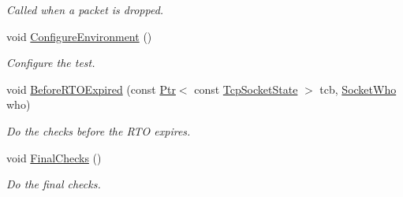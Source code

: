 \begin{DoxyCompactItemize}
\begin{DoxyCompactList}\small\item\em Called when a packet is dropped. \end{DoxyCompactList}\item 
void \hyperlink{classTcpBytesInFlightTest_a09c98c951bad56eff605cffc7f52081d}{Configure\+Environment} ()
\begin{DoxyCompactList}\small\item\em Configure the test. \end{DoxyCompactList}\item 
void \hyperlink{classTcpBytesInFlightTest_a7e615ecdc1d3f989ab19dbaaa7752637}{Before\+R\+T\+O\+Expired} (const \hyperlink{classns3_1_1Ptr}{Ptr}$<$ const \hyperlink{classns3_1_1TcpSocketState}{Tcp\+Socket\+State} $>$ tcb, \hyperlink{classns3_1_1TcpGeneralTest_a29338e6b7137cad650c2ff835713f6ee}{Socket\+Who} who)
\begin{DoxyCompactList}\small\item\em Do the checks before the R\+TO expires. \end{DoxyCompactList}\item 
void \hyperlink{classTcpBytesInFlightTest_a7396d525e35a495f132c89cc77735fec}{Final\+Checks} ()
\begin{DoxyCompactList}\small\item\em Do the final checks. \end{DoxyCompactList}\end{DoxyCompactItemize}
